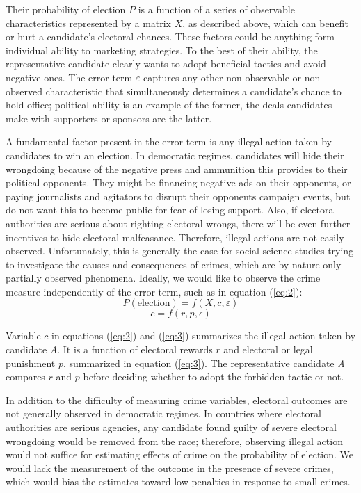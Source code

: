\documentclass[11pt]{article}
\newcommand{\refp}[1]{(\ref{#1})}
\begin{document}
Their probability of election $P$ is a function of a series of observable characteristics represented by a matrix $X$, as described above, which can benefit or hurt a candidate's electoral chances. These factors could be anything form individual ability to marketing strategies. To the best of their ability, the representative candidate clearly wants to adopt beneficial tactics and avoid negative ones. The error term $\varepsilon$ captures any other non-observable or non-observed characteristic that simultaneously determines a candidate's chance to hold office; political ability is an example of the former, the deals candidates make with supporters or sponsors are the latter.

A fundamental factor present in the error term is any illegal action taken by candidates to win an election. In democratic regimes, candidates will hide their wrongdoing because of the negative press and ammunition this provides to their political opponents. They might be financing negative ads on their opponents, or paying journalists and agitators to disrupt their opponents campaign events, but do not want this to become public for fear of losing support. Also, if electoral authorities are serious about righting electoral wrongs, there will be even further incentives to hide electoral malfeasance. Therefore, illegal actions are not easily observed. Unfortunately, this is generally the case for social science studies trying to investigate the causes and consequences of crimes, which are by nature only partially observed phenomena. Ideally, we would like to observe the crime measure independently of the error term, such as in equation \refp{eq:2}:
\begin{equation} \label{eq:2}
  P(\text{election}) = f(X, c, \varepsilon)
\end{equation}
\begin{equation} \label{eq:3}
  c = f(r, p, \epsilon)
\end{equation}

Variable $c$ in equations \refp{eq:2} and \refp{eq:3} summarizes the illegal action taken by candidate \emph{A}. It is a function of electoral rewards $r$ and electoral or legal punishment $p$, summarized in equation \refp{eq:3}. The representative candidate \emph{A} compares $r$ and $p$ before deciding whether to adopt the forbidden tactic or not.

In addition to the difficulty of measuring crime variables, electoral outcomes are not generally observed in democratic regimes. In countries where electoral authorities are serious agencies, any candidate found guilty of severe electoral wrongdoing would be removed from the race; therefore, observing illegal action would not suffice for estimating effects of crime on the probability of election. We would lack the measurement of the outcome in the presence of severe crimes, which would bias the estimates toward low penalties in response to small crimes.
\end{document}
